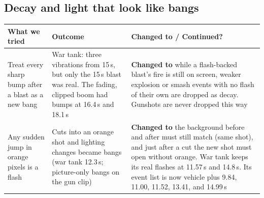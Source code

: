 \documentclass[11pt,a4paper]{article}
\begin{document}
\subsection*{Decay and light that look like bangs}
\begin{center}
\small
\begin{tabularx}{\textwidth}{@{}>{\raggedright\arraybackslash}p{4cm}>{\raggedright\arraybackslash}p{4cm}>{\raggedright\arraybackslash}X@{}}
\toprule
\textbf{What we tried} & \textbf{Outcome} & \textbf{Changed to / Continued?} \\
\midrule
Treat every sharp bump after a blast as a new bang & War tank: three vibrations from 15\,s, but only the 15\,s blast was real. The fading, clipped boom had bumps at 16.4\,s and 18.1\,s & \textbf{Changed to} while a flash-backed blast's fire is still on screen, weaker explosion or smash events with no flash of their own are dropped as decay. Gunshots are never dropped this way \\
\addlinespace
Any sudden jump in orange pixels is a flash & Cuts into an orange shot and lighting changes became bangs (war tank 12.3\,s; picture-only bangs on the gun clip) & \textbf{Changed to} the background before and after must still match (same shot), and just after a cut the new shot must open without orange. War tank keeps its real flashes at 11.57\,s and 14.8\,s. Its event list is now vehicle plus 9.84, 11.00, 11.52, 13.41, and 14.99\,s \\
\bottomrule
\end{tabularx}
\end{center}
\end{document}
